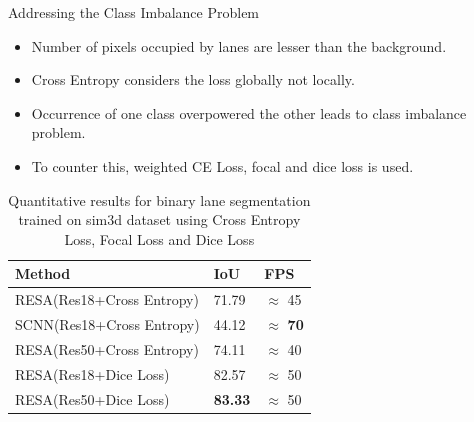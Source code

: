 \documentclass[aspectratio=169]{beamer}
\begin{document}
\begin{frame}{Addressing the Class Imbalance Problem}
\begin{itemize}
    \item Number of pixels occupied by lanes are lesser than the background.
    \item Cross Entropy considers the loss globally not locally. 
    \item Occurrence of one class overpowered the other leads to class imbalance problem.
    \item To counter this, weighted CE Loss, focal and dice loss is used. 
\end{itemize}

    \begin{table}[h!]
    \caption{Quantitative results for binary lane segmentation trained on sim3d dataset using Cross Entropy Loss, Focal Loss and Dice Loss}
    \centering
    \begin{tabular}{|l|l|l|}
    \hline
        \textbf{Method} & \textbf{IoU} & \textbf{FPS} \\ \hline
        RESA(Res18+Cross Entropy)  & 71.79 & $\approx$ 45 \\ \hline
        SCNN(Res18+Cross Entropy) & 44.12 & $\approx$ \textbf{70}  \\ \hline
        RESA(Res50+Cross Entropy)  & 74.11 & $\approx$ 40  \\ \hline

        RESA(Res18+Dice Loss) & 82.57 & $\approx$ 50 \\\hline
        RESA(Res50+Dice Loss) & \textbf{83.33} & $\approx$ 50 \\\hline
    \end{tabular}
\end{table}
\end{frame}
\end{document}
